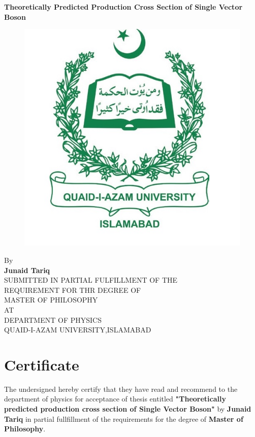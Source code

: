 \documentclass[a4paper,12pt]{report}
\numberwithin{equation}{section}
\begin{document}
\newpage
\begin{titlepage}
\begin{center}
\vspace {0.5cm}
\huge{\textbf{Theoretically Predicted Production Cross Section of Single Vector Boson}}\\
\begin{figure}[ht!]
\centering
\includegraphics[scale=0.8]{QAU.jpg}
\end{figure}
\vspace{0.8cm}
\Large{By}\\[0.5cm]
\Large{\textbf{Junaid Tariq}}\\[2cm]
\Large{SUBMITTED IN PARTIAL FULFILLMENT OF THE}\\
\Large{REQUIREMENT FOR THR DEGREE OF}\\
\Large{MASTER OF PHILOSOPHY}\\
\Large{AT}\\
\Large{DEPARTMENT OF PHYSICS}\\
\Large{QUAID-I-AZAM UNIVERSITY,ISLAMABAD}
\end{center}

\end{titlepage}

\newpage
    \chapter*{Certificate} %
    \label{cha:certificate}
    The undersigned hereby certify that they have read and recommend to the department of physics for acceptance of thesis entitled \textbf{"Theoretically predicted production cross section of Single Vector Boson"} by \textbf{Junaid Tariq} in partial fullfillment of the requirements for the degree of \textbf{Master of Philosophy}.
\end{document}

